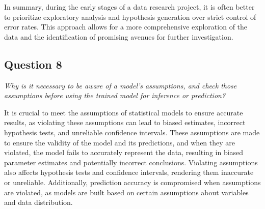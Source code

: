 \documentclass[
]{article}
\begin{document}
In summary, during the early stages of a data research project, it is
often better to prioritize exploratory analysis and hypothesis
generation over strict control of error rates. This approach allows for
a more comprehensive exploration of the data and the identification of
promising avenues for further investigation.

\hypertarget{question-8}{%
\subsection{Question 8}\label{question-8}}

\emph{Why is it necessary to be aware of a model's assumptions, and
check those assumptions before using the trained model for inference or
prediction?}

It is crucial to meet the assumptions of statistical models to ensure
accurate results, as violating these assumptions can lead to biased
estimates, incorrect hypothesis tests, and unreliable confidence
intervals. These assumptions are made to ensure the validity of the
model and its predictions, and when they are violated, the model fails
to accurately represent the data, resulting in biased parameter
estimates and potentially incorrect conclusions. Violating assumptions
also affects hypothesis tests and confidence intervals, rendering them
inaccurate or unreliable. Additionally, prediction accuracy is
compromised when assumptions are violated, as models are built based on
certain assumptions about variables and data distribution.
\end{document}
